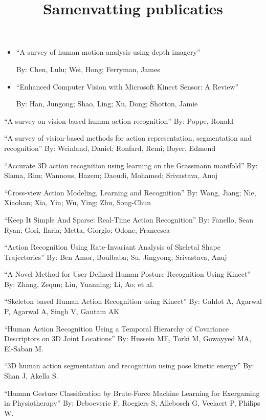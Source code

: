 \documentclass{article}
\title{Samenvatting publicaties}
\author{}
\date{}
\begin{document}
   \maketitle
   \begin{itemize}
      \item    “A survey of human motion analysis using depth imagery”

      By: Chen, Lulu; Wei, Hong; Ferryman, James
      \item “Enhanced Computer Vision with Microsoft Kinect Sensor: A Review”
      
      By: Han, Jungong; Shao, Ling; Xu, Dong; Shotton, Jamie
   \end{itemize}

 


 
“A survey on vision-based human action recognition” 
By: Poppe, Ronald
 
“A survey of vision-based methods for action representation, segmentation and recognition”
By: Weinland, Daniel; Ronfard, Remi; Boyer, Edmond
 
“Accurate 3D action recognition using learning on the Grassmann manifold”
By: Slama, Rim; Wannous, Hazem; Daoudi, Mohamed; Srivastava, Anuj
 
“Cross-view Action Modeling, Learning and Recognition”
By: Wang, Jiang; Nie, Xiaohan; Xia, Yin; Wu, Ying; Zhu, Song-Chun
 
“Keep It Simple And Sparse: Real-Time Action Recognition”
By: Fanello, Sean Ryan; Gori, Ilaria; Metta, Giorgio; Odone, Francesca
 
“Action Recognition Using Rate-Invariant Analysis of Skeletal Shape Trajectories”
By: Ben Amor, Boulbaba; Su, Jingyong; Srivastava, Anuj
 
“A Novel Method for User-Defined Human Posture Recognition Using Kinect” 
By: Zhang, Zequn; Liu, Yuanning; Li, Ao; et al.
 
“Skeleton based Human Action Recognition using Kinect”
By: Gahlot A, Agarwal P, Agarwal A, Singh V, Gautam AK
 
“Human Action Recognition Using a Temporal Hierarchy of Covariance Descriptors on 3D Joint Locations”
By: Hussein ME, Torki M, Gowayyed MA, El-Saban M. 
 
“3D human action segmentation and recognition using pose kinetic energy” 
By: Shan J, Akella S.
 
“Human Gesture Classification by Brute-Force Machine Learning for Exergaming in Physiotherapy”
By: Deboeverie F, Roegiers S, Allebosch G, Veelaert P, Philips W.
\end{document}
